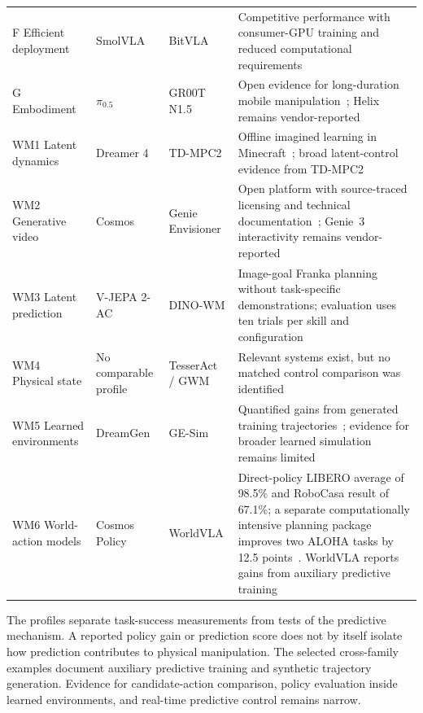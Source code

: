 \documentclass{ieeeaccess}
\begin{document}
\begin{table}[!t]
\begin{tabular}{p{2.4cm}p{3.0cm}p{2.2cm}p{7.7cm}}
F Efficient deployment &
SmolVLA &
BitVLA &
Competitive performance with consumer-GPU training and reduced computational requirements~\cite{smolvla} \\

G Embodiment &
$\pi_{0.5}$ &
GR00T N1.5 &
Open evidence for long-duration mobile manipulation~\cite{pi05}; Helix remains vendor-reported \\

\midrule
WM1 Latent dynamics &
Dreamer 4 &
TD-MPC2 &
Offline imagined learning in Minecraft~\cite{dreamer4}; broad latent-control evidence from TD-MPC2~\cite{tdmpc2} \\

WM2 Generative video &
Cosmos &
Genie Envisioner &
Open platform with source-traced licensing and technical documentation~\cite{cosmos}; Genie~3 interactivity remains vendor-reported~\cite{genie3} \\

WM3 Latent prediction &
V-JEPA 2-AC &
DINO-WM &
Image-goal Franka planning without task-specific demonstrations; evaluation uses ten trials per skill and configuration~\cite{vjepa2} \\

WM4 Physical state &
No comparable profile &
TesserAct / GWM &
Relevant systems exist, but no matched control comparison was identified \\

WM5 Learned environments &
DreamGen &
GE-Sim &
Quantified gains from generated training trajectories~\cite{dreamgen}; evidence for broader learned simulation remains limited \\

WM6 World-action models &
Cosmos Policy &
WorldVLA &
Direct-policy LIBERO average of 98.5\% and RoboCasa result of 67.1\%; a separate computationally intensive planning package improves two ALOHA tasks by 12.5 points~\cite{cosmospolicy}. WorldVLA reports gains from auxiliary predictive training~\cite{worldvla} \\
\bottomrule
\end{tabular}
\end{table}

\textcolor[RGB]{104,48,148}{The profiles separate task-success measurements from tests of the predictive mechanism. A reported policy gain or prediction score does not by itself isolate how prediction contributes to physical manipulation.} \textcolor[RGB]{104,48,148}{The selected cross-family examples document auxiliary predictive training and synthetic trajectory generation.} Evidence for candidate-action comparison, policy evaluation inside learned environments, and real-time predictive control remains narrow.
\end{document}
